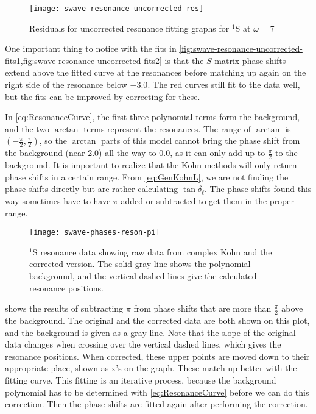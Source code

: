 \documentclass[Dissertation.tex]{subfiles}
\begin{document}
\begin{figure}
	\centering
	\texttt{[image: swave-resonance-uncorrected-res]}
	\caption{Residuals for uncorrected resonance fitting graphs for $^1$S at $\omega = 7$}
	\label{fig:swave-resonance-uncorrected-res}
\end{figure}

One important thing to notice with the fits in
\cref{fig:swave-resonance-uncorrected-fits1,fig:swave-resonance-uncorrected-fits2} is that the
$S$-matrix phase shifts extend above the fitted curve at the resonances before 
matching up again on the right side of the resonance below $-3.0$. The red 
curves still fit to the data well, but the fits can be improved by correcting 
for these. 

In \cref{eq:ResonanceCurve}, the first three polynomial terms form the 
background, and the two $\arctan$ terms represent the resonances. The range 
of $\arctan$ is $(-\frac{\pi}{2},\frac{\pi}{2})$, so the $\arctan$ parts of 
this model cannot bring the phase shift from the background (near 2.0) all 
the way to 0.0, as it can only add up to $\frac{\pi}{2}$ to the background. 
It is important to realize that the Kohn methods will only return phase 
shifts in a certain range. From \cref{eq:GenKohnL}, we are not finding the 
phase shifts directly but are rather calculating $\tan \delta_\ell$. The 
phase shifts found this way sometimes have to have $\pi$ added or subtracted 
to get them in the proper range.

\begin{figure}
	\centering
	\texttt{[image: swave-phases-reson-pi]}
	\caption[$^1$S resonance data showing correction]{$^1$S resonance data showing raw data from complex Kohn and the corrected version. The solid gray line shows the polynomial background, and the vertical dashed lines give the calculated resonance positions.}
	\label{fig:swave-phases-reson-pi}
\end{figure}

 shows the results of subtracting $\pi$ from 
phase shifts that are more than $\frac{\pi}{2}$ above the background. The 
original and the corrected data are both shown on this plot, and the 
background is given as a gray line. Note that the slope of the original data 
changes when crossing over the vertical dashed lines, which gives the 
resonance positions. When corrected, these upper points are moved down to 
their appropriate place, shown as x's on the graph. These match up better 
with the fitting curve. This fitting is an iterative process, because the 
background polynomial has to be determined with \cref{eq:ResonanceCurve} 
before we can do this correction. Then the phase shifts are fitted again 
after performing the correction.
\end{document}
